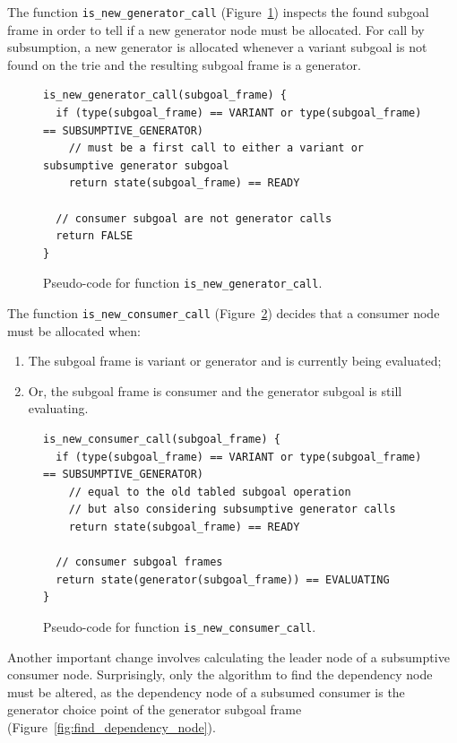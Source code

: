 The function \texttt{is\_new\_generator\_call} (Figure~\ref{fig:is_new_generator_call}) inspects the found
subgoal frame in order to tell if a new generator node must be allocated.
For call by subsumption, a new generator is allocated whenever a variant subgoal is not found
on the trie and the resulting subgoal frame is a generator.

\begin{figure}[ht]
\begin{Verbatim}
is_new_generator_call(subgoal_frame) {
  if (type(subgoal_frame) == VARIANT or type(subgoal_frame) == SUBSUMPTIVE_GENERATOR)
    // must be a first call to either a variant or subsumptive generator subgoal
    return state(subgoal_frame) == READY
    
  // consumer subgoal are not generator calls
  return FALSE
}
\end{Verbatim}
\caption{Pseudo-code for function \texttt{is\_new\_generator\_call}.}
\label{fig:is_new_generator_call}
\end{figure}

The function \texttt{is\_new\_consumer\_call} (Figure~\ref{fig:is_new_consumer_call}) decides
that a consumer node must be allocated when:

\begin{enumerate}
  \item The subgoal frame is variant or generator and is currently being evaluated;
  \item Or, the subgoal frame is consumer and the generator subgoal is still evaluating.
\end{enumerate}

\begin{figure}[ht]
\begin{Verbatim}
is_new_consumer_call(subgoal_frame) {
  if (type(subgoal_frame) == VARIANT or type(subgoal_frame) == SUBSUMPTIVE_GENERATOR)
    // equal to the old tabled subgoal operation
    // but also considering subsumptive generator calls
    return state(subgoal_frame) == READY
  
  // consumer subgoal frames
  return state(generator(subgoal_frame)) == EVALUATING
}
\end{Verbatim}
\caption{Pseudo-code for function \texttt{is\_new\_consumer\_call}.}
\label{fig:is_new_consumer_call}
\end{figure}

Another important change involves calculating the leader node of a subsumptive consumer node.
Surprisingly, only the algorithm to find the dependency node must be altered, as
the dependency node of a subsumed consumer is the generator choice point of
the generator subgoal frame (Figure~\ref{fig:find_dependency_node}).  

